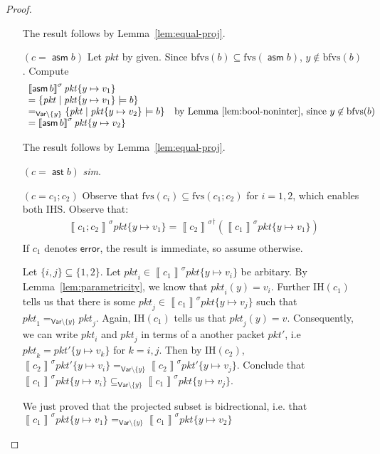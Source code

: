 \documentclass{article}
\newcommand{\pkt}{\mathit{pkt}}
\newcommand{\error}{\mathsf{error}}
\newcommand{\denote}[1]{\left\llbracket#1\right\rrbracket}
\newcommand{\Var}{\mathsf{Var}}
\newcommand{\assert}{\mathop{\mathsf{ast}}}
\newcommand{\assume}{\mathop{\mathsf{asm}}}
\newcommand{\fvs}{\textrm{fvs}}
\newcommand{\bfvs}{\textrm{bfvs}}
\begin{document}
\begin{proof}
\begin{enumerate}[align=left]
    The result follows by Lemma~\ref{lem:equal-proj}.

  \item[$(c = \assume b)$]
    Let $\pkt$ by given. Since $\bfvs(b) \subseteq \fvs(\assume b)$, $y \not\in \bfvs(b)$.
    Compute \[
    \begin{array}{ll}
      \denote{\assume b}^\sigma \pkt\{y \mapsto v_1\} \\
      = \{\pkt \mid \pkt\{y \mapsto v_1\} \models b\}\\
      =_{\Var \setminus \{y\}} \{\pkt \mid \pkt\{y \mapsto v_2\} \models b\} & \text{by Lemma~\ref{lem:bool-noninter}, since }y \not\in \bfvs(b) \\
      = \denote{\assume b}^\sigma \pkt\{y \mapsto v_2\}
    \end{array}
    \]

    The result follows by Lemma~\ref{lem:equal-proj}.

    \item[$(c = \assert b)$] \textit{sim}.
    \item[$(c = c_1;c_2)$] Observe that $\fvs(c_i) \subseteq \fvs(c_1;c_2)$ for
      $i = 1,2$, which enables both IHS. Observe that:
      \[\begin{array}{ll}
      \denote{c_1;c_2}^\sigma\pkt\{y \mapsto v_1\}
      = {\denote{c_2}^\sigma}^\dagger\left(\denote{c_1}^\sigma\pkt\{y\mapsto v_1\}\right) \\
      \end{array}
      \]
      If $c_1$ denotes $\error$, the result is immediate, so assume otherwise.

      Let $\{i,j\} \subseteq \{1,2\}$. Let $\pkt_i \in
      \denote{c_1}^\sigma\pkt\{y \mapsto v_i\}$ be arbitary. By
      Lemma~\ref{lem:parametricity}, we know that $\pkt_i(y) = v_i$. Further
      IH$(c_1)$ tells us that there is some $\pkt_j \in
      \denote{c_1}^\sigma\pkt\{y\mapsto v_j\}$ such that $\pkt_1 =_{\Var
        \setminus \{y\}} \pkt_j$. Again, IH$(c_1)$ tells us that $\pkt_j(y) =
      v$. Consequently, we can write $\pkt_i$ and $\pkt_j$ in terms of a another
      packet $\pkt'$, i.e $\pkt_k = \pkt'\{y \mapsto v_k\}$ for $k = i,j$. Then
      by IH$(c_2)$, $\denote{c_2}^\sigma\pkt'\{y \mapsto v_i\} =_{\Var \setminus \{y\}}
      \denote{c_2}^\sigma \pkt'\{y \mapsto v_j\}$. Conclude that
      $\denote{c_1}^\sigma\pkt\{y \mapsto v_i\} \subseteq_{\Var \setminus \{y\} }
      \denote{c_1}^\sigma\pkt\{y \mapsto v_j\}$.

      We just proved that the projected subset is bidrectional, i.e. that
      $\denote{c_1}^\sigma\pkt\{y \mapsto v_1\} =_{\Var \setminus\{y\}}
      \denote{c_1}^\sigma\pkt\{y \mapsto v_2\}$


\end{enumerate}
\end{proof}
\end{document}
